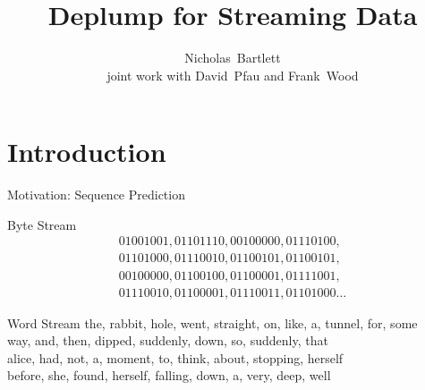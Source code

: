 \documentclass{beamer}
\title[Deplump for Streaming Data] 
{
	Deplump for Streaming Data
}
\author[Bartlett]
{
  Nicholas~Bartlett \\ {\tiny joint work with David~Pfau and Frank~Wood } %
}
\institute[Columbia University]
{
  Columbia University
}
\begin{document}
\begin{frame}
	\titlepage
\end{frame}

\section{Introduction}

%
%

\begin{frame}[t]{Motivation: Sequence Prediction}
	\begin{block}{Byte Stream}
		\[
		\begin{array}{l}
			01001001 , 01101110 , 00100000 , 01110100,\\
			01101000 , 01110010 , 01100101 , 01100101,\\
			00100000 , 01100100 , 01100001 , 01111001,\\
			01110010 , 01100001 , 01110011 , 01101000\ldots
		\end{array}
		\]
	\end{block}
	
	\begin{block}{Word Stream}
		the, rabbit, hole, went, straight, on, like, a, tunnel, for, some\\
		way, and, then, dipped, suddenly, down, so, suddenly, that\\
		alice, had, not, a, moment, to, think, about, stopping, herself\\
		before, she, found, herself, falling, down, a, very, deep, well
	\end{block}
\end{frame}
\end{document}
